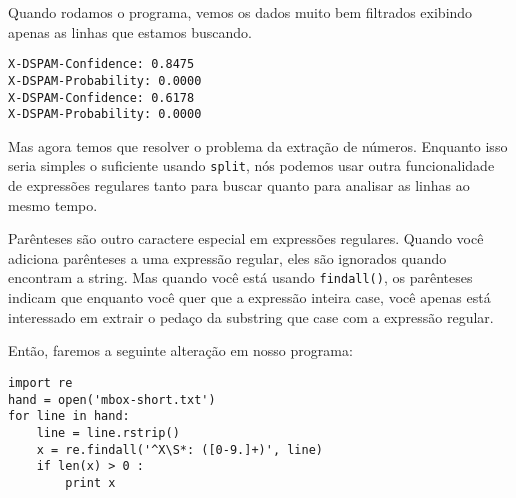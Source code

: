 Quando rodamos o programa, vemos os dados muito bem filtrados exibindo 
apenas as linhas que estamos buscando. 

\beforeverb
\begin{verbatim}
X-DSPAM-Confidence: 0.8475
X-DSPAM-Probability: 0.0000
X-DSPAM-Confidence: 0.6178
X-DSPAM-Probability: 0.0000
\end{verbatim}
\afterverb
%

Mas agora temos que resolver o problema da extração de números. Enquanto isso seria simples o 
suficiente usando {\tt split}, nós podemos usar outra funcionalidade de expressões regulares 
tanto para buscar quanto para analisar as linhas ao mesmo tempo.


Parênteses são outro caractere especial em expressões regulares. Quando você adiciona parênteses 
a uma expressão regular, eles são ignorados quando encontram a string. Mas quando você está 
usando {\tt findall()}, os parênteses indicam que enquanto você quer que a expressão inteira 
case, você apenas está interessado em extrair o pedaço da substring que case com a expressão 
regular.


Então, faremos a seguinte alteração em nosso programa:

\beforeverb
\begin{verbatim}
import re
hand = open('mbox-short.txt')
for line in hand:
    line = line.rstrip()
    x = re.findall('^X\S*: ([0-9.]+)', line)
    if len(x) > 0 :
        print x
\end{verbatim}
\afterverb
%

